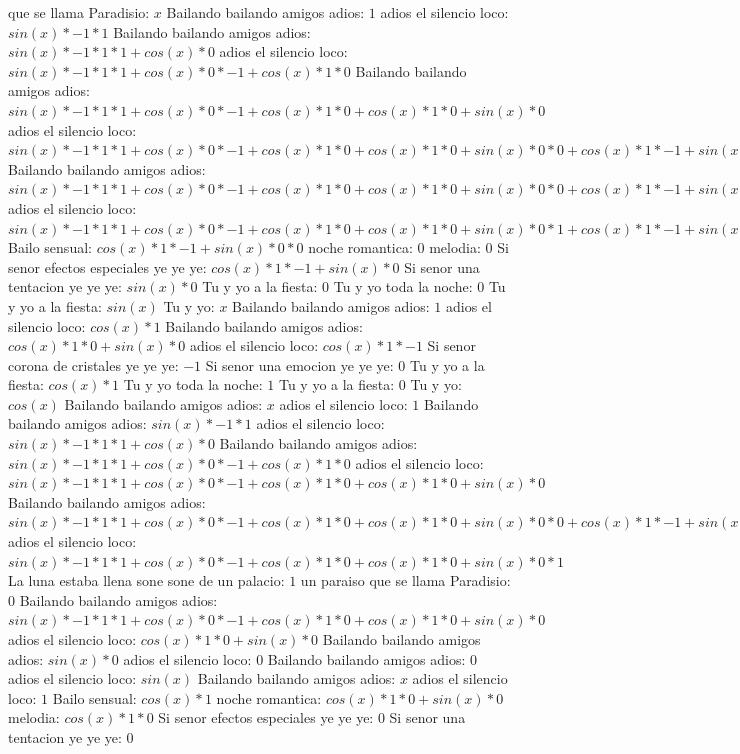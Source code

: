 \documentclass{article}
\begin{document}
que se llama Paradisio: $x$ Bailando bailando amigos adios: $1$  \newline adios el silencio loco: $sin(x)*-1*1$ Bailando bailando amigos adios: $sin(x)*-1*1*1+cos(x)*0$ adios el silencio loco: ${sin(x)*-1*1*1+cos(x)*0}*-1+cos(x)*1*0$ Bailando bailando amigos adios: ${sin(x)*-1*1*1+cos(x)*0}*-1+cos(x)*1*0+cos(x)*1*0+sin(x)*0$ adios el silencio loco: ${{sin(x)*-1*1*1+cos(x)*0}*-1+cos(x)*1*0+cos(x)*1*0+sin(x)*0}*0+{cos(x)*1*-1+sin(x)*0}*0$ Bailando bailando amigos adios: ${{sin(x)*-1*1*1+cos(x)*0}*-1+cos(x)*1*0+cos(x)*1*0+sin(x)*0}*0+{cos(x)*1*-1+sin(x)*0}*0+{cos(x)*1*-1+sin(x)*0}*0+sin(x)*-1*0$ adios el silencio loco: ${{sin(x)*-1*1*1+cos(x)*0}*-1+cos(x)*1*0+cos(x)*1*0+sin(x)*0}*1+{cos(x)*1*-1+sin(x)*0}*0$  \newline Bailo sensual: ${cos(x)*1*-1+sin(x)*0}*0$ noche romantica: $0$ melodia: $0$  \newline Si senor efectos especiales ye ye ye: $cos(x)*1*-1+sin(x)*0$  \newline Si senor una tentacion ye ye ye: $sin(x)*0$ Tu y yo a la fiesta: $0$ Tu y yo toda la noche: $0$  \newline Tu y yo a la fiesta: $sin(x)$  \newline Tu y yo: $x$ Bailando bailando amigos adios: $1$  \newline adios el silencio loco: $cos(x)*1$ Bailando bailando amigos adios: $cos(x)*1*0+sin(x)*0$ adios el silencio loco: $cos(x)*1*-1$ Si senor corona de cristales ye ye ye: $-1$ Si senor una emocion ye ye ye: $0$  \newline Tu y yo a la fiesta: $cos(x)*1$ Tu y yo toda la noche: $1$ Tu y yo a la fiesta: $0$  \newline Tu y yo: $cos(x)$  \newline Bailando bailando amigos adios: $x$ adios el silencio loco: $1$  \newline Bailando bailando amigos adios: $sin(x)*-1*1$ adios el silencio loco: $sin(x)*-1*1*1+cos(x)*0$ Bailando bailando amigos adios: ${sin(x)*-1*1*1+cos(x)*0}*-1+cos(x)*1*0$ adios el silencio loco: ${sin(x)*-1*1*1+cos(x)*0}*-1+cos(x)*1*0+cos(x)*1*0+sin(x)*0$ Bailando bailando amigos adios: ${{sin(x)*-1*1*1+cos(x)*0}*-1+cos(x)*1*0+cos(x)*1*0+sin(x)*0}*0+{cos(x)*1*-1+sin(x)*0}*0$ adios el silencio loco: ${{sin(x)*-1*1*1+cos(x)*0}*-1+cos(x)*1*0+cos(x)*1*0+sin(x)*0}*1$ La luna estaba llena sone sone de un palacio: $1$ un paraiso que se llama Paradisio: $0$  \newline Bailando bailando amigos adios: ${sin(x)*-1*1*1+cos(x)*0}*-1+cos(x)*1*0+cos(x)*1*0+sin(x)*0$  \newline adios el silencio loco: $cos(x)*1*0+sin(x)*0$  \newline Bailando bailando amigos adios: $sin(x)*0$ adios el silencio loco: $0$ Bailando bailando amigos adios: $0$  \newline adios el silencio loco: $sin(x)$  \newline Bailando bailando amigos adios: $x$ adios el silencio loco: $1$  \newline Bailo sensual: $cos(x)*1$ noche romantica: $cos(x)*1*0+sin(x)*0$ melodia: $cos(x)*1*0$ Si senor efectos especiales ye ye ye: $0$ Si senor una tentacion ye ye ye: $0$  
\end{document}
